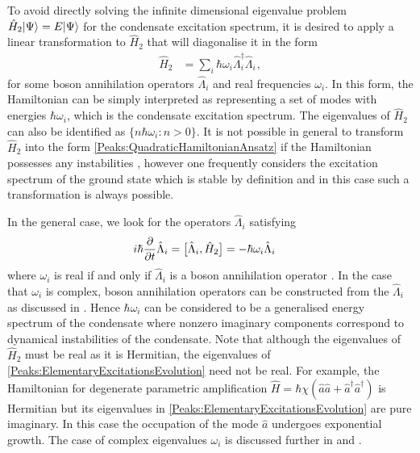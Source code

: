 To avoid directly solving the infinite dimensional eigenvalue problem $\hat{H}_2 {\left|\Psi\right>} = E {\left|\Psi\right>}$ for the condensate excitation spectrum, it is desired to apply a linear transformation to $\hat{H}_2$ that will diagonalise it in the form
\begin{align}
    \label{Peaks:QuadraticHamiltonianAnsatz}
    \hat{H}_2 &= \sum_i \hbar \omega_i \hat{\Lambda}_i^\dagger \hat{\Lambda}_i^{\phantom{\dagger}},
\end{align}
for some boson annihilation operators $\hat{\Lambda}_i$ and real frequencies $\omega_i$. In this form, the Hamiltonian can be simply interpreted as representing a set of modes with energies $\hbar \omega_i$, which is the condensate excitation spectrum. The eigenvalues of $\hat{H}_2$ can also be identified as $\{n \hbar \omega_i : n > 0 \}$. It is not possible in general to transform $\hat{H}_2$ into the form \eqref{Peaks:QuadraticHamiltonianAnsatz} if the Hamiltonian possesses any instabilities \citep{Leonhardt:2003}, however one frequently considers the excitation spectrum of the ground state which is stable by definition and in this case such a transformation is always possible.

In the general case, we look for the operators $\hat{\Lambda}_i$ satisfying
\begin{align}
    \label{Peaks:ElementaryExcitationsEvolution}
    i \hbar \frac{\partial }{\partial t}\hat{\Lambda}_i &= \comm{\hat{\Lambda}_i, \hat{H}_2 } = - \hbar \omega_i \hat{\Lambda}_i
\end{align}
where $\omega_i$ is real if and only if $\hat{\Lambda}_i$ is a boson annihilation operator \citep{Leonhardt:2003}. In the case that $\omega_i$ is complex, boson annihilation operators can be constructed from the $\hat{\Lambda}_i$ as discussed in . Hence $\hbar\omega_i$ can be considered to be a generalised energy spectrum of the condensate where nonzero imaginary components correspond to dynamical instabilities of the condensate. Note that although the eigenvalues of $\hat{H}_2$ must be real as it is Hermitian, the eigenvalues of \eqref{Peaks:ElementaryExcitationsEvolution} need not be real. For example, the Hamiltonian for degenerate parametric amplification $\hat{H} = \hbar\chi \left(\hat{a}\hat{a} + \hat{a}^\dagger \hat{a}^\dagger \right)$ is Hermitian but its eigenvalues in \eqref{Peaks:ElementaryExcitationsEvolution} are pure imaginary. In this case the occupation of the mode $\hat{a}$ undergoes exponential growth. The case of complex eigenvalues $\omega_i$ is discussed further in  and .

